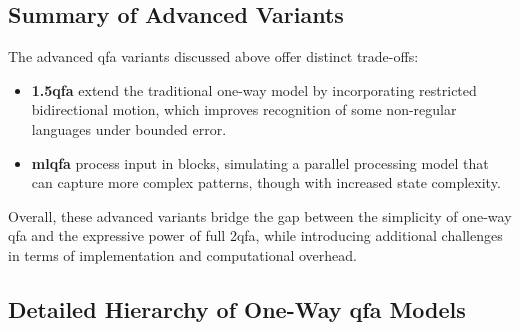 \subsection*{Summary of Advanced Variants}
The advanced \gls{qfa} variants discussed above offer distinct trade-offs:
\begin{itemize}
    \item \textbf{\gls{1.5qfa}} extend the traditional one-way model by incorporating restricted bidirectional motion, which improves recognition of some non-regular languages under bounded error.
    \item \textbf{\gls{mlqfa}} process input in blocks, simulating a parallel processing model that can capture more complex patterns, though with increased state complexity.
\end{itemize}
Overall, these advanced variants bridge the gap between the simplicity of one-way \gls{qfa} and the expressive power of full \gls{2qfa}, while introducing additional challenges in terms of implementation and computational overhead.


\subsection*{Detailed Hierarchy of One-Way \gls{qfa} Models}
\label{subsec:hierarchy-diagram}

